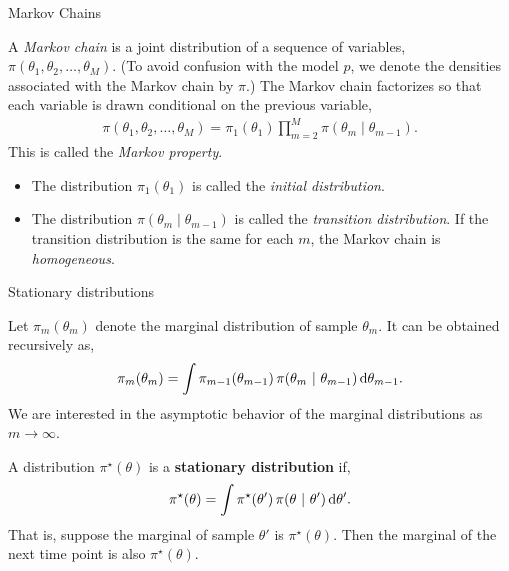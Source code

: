 \documentclass[aspectratio=169]{beamer}
\begin{document}
\begin{frame}[t,allowframebreaks]{Markov Chains}\label{markov-chains}

A \emph{Markov chain} is a joint distribution of a sequence of
variables, \(\pi(\theta_1, \theta_2, \ldots, \theta_M)\). (To avoid
confusion with the model \(p\), we denote the densities associated with
the Markov chain by \(\pi\).) The Markov chain factorizes so that each
variable is drawn conditional on the previous variable, \begin{align*}
\pi(\theta_1, \theta_2, \ldots, \theta_M) = \pi_{1}(\theta_1) \prod_{m=2}^M \pi(\theta_m \mid \theta_{m-1}).
\end{align*} This is called the \emph{Markov property}.

\begin{itemize}
\item
  The distribution \(\pi_1(\theta_1)\) is called the \emph{initial
  distribution}.
\item
  The distribution \(\pi(\theta_m \mid \theta_{m-1})\) is called the
  \emph{transition distribution}. If the transition distribution is the
  same for each \(m\), the Markov chain is \emph{homogeneous}.
\end{itemize}
\end{frame}

\begin{frame}[t,allowframebreaks]{Stationary distributions}\label{stationary-distributions}

Let \(\pi_m(\theta_m)\) denote the marginal distribution of sample
\(\theta_m\). It can be obtained recursively as, \begin{align*}
\pi_m(\theta_m) = \int \pi_{m-1}(\theta_{m-1}) \, \pi(\theta_m ~\vert~ \theta_{m-1}) \mathop{}\!\mathrm{d} \theta_{m-1}.
\end{align*} We are interested in the asymptotic behavior of the
marginal distributions as \(m \to \infty\).

A distribution \(\pi^\star(\theta)\) is a \textbf{stationary
distribution} if, \begin{align*}
\pi^\star(\theta) = \int \pi^\star(\theta') \, \pi(\theta ~\vert~ \theta') \mathop{}\!\mathrm{d} \theta'.
\end{align*} That is, suppose the marginal of sample \(\theta'\) is
\(\pi^\star(\theta)\). Then the marginal of the next time point is also
\(\pi^\star(\theta)\).
\end{frame}
\end{document}
